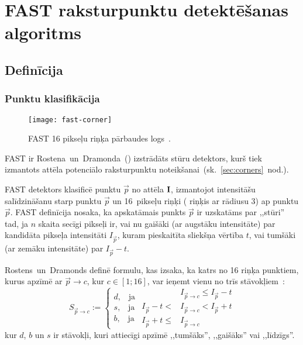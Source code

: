 \section{FAST raksturpunktu detektēšanas algoritms} \label{sec:fast}
\setcounter{lstlisting}{0} %

\newcommand{\Ip}{I_{\vec{p}}}
\newcommand{\Ipc}{ {I_{\vec{p} \to c}} }
\newcommand{\Spc}{ {S_{\vec{p} \to c}} }

\subsection{Definīcija} \label{sec:fast-def}
\subsubsection{Punktu klasifikācija}

\begin{figure}[tbh]
	\centering
	\texttt{[image: fast-corner]}
	\caption{FAST 16 pikseļu riņķa pārbaudes logs~\cite{FAST}.}
	\label{fig:fast}
\end{figure}

FAST ir Rostena~un~Dramonda\cite{FAST}~()
izstrādāts stūru detektors, kurš tiek izmantots attēla potenciālo 
raksturpunktu noteikšanai~(sk.~\ref{sec:corners}~nod.).

FAST detektors klasificē punktu $\vec{p}$ no attēla $\mathbf{I}$, izmantojot
intensitāšu
salīdzināšanu starp punktu $\vec{p}$ un 16~pikseļu riņķi ( riņķis
ar rādiusu 3) ap punktu $\vec{p}$. 
FAST definīcija nosaka, ka apskatāmais punkts $\vec{p}$ ir uzskatāms par
,,stūri'' tad, ja $n$ skaita secīgi pikseļi ir, vai nu gaišāki
(ar augstāku intensitāte) par kandidāta pikseļa intensitāti $\Ip$, kuram
pieskaitīta sliekšņa vērtība $t$, vai tumšāki (ar zemāku intensitāte) par
$\Ip - t$. \cite{Rosten-tracking}\cite{FAST}

Rostens~un~Dramonds definē formulu, kas izsaka, ka katrs no 16 riņķa
punktiem, kurus apzīmē ar $\vec{p}\to c$, kur $c \in [1; 16]$,
var ieņemt vienu no trīs stāvokļiem~\cite{FASTER}\cite{FAST}:
\begin{equation}\label{eq:fast-old}
	\Spc := \left\{
		\begin{array}{c}
			d\text{,}\quad\text{ja}\\
			s\text{,}\quad\text{ja}\\
			b\text{,}\quad\text{ja}
		\end{array}
		\begin{aligned}
			           & \Ipc \leq \Ip-t \\
			   \Ip-t < & \Ipc < \Ip+t \\
			\Ip+t \leq & \Ipc
		\end{aligned}
		\right.
\end{equation}
kur $d$, $b$ un $s$ ir stāvokļi, kuri attiecīgi apzīmē ,,tumšāks'',
,,gaišāks'' vai ,,līdzīgs''.

